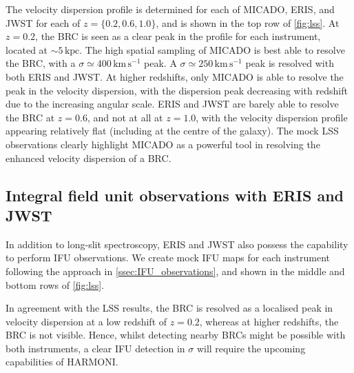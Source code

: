 \documentclass[twocolumn]{aastex631}
\newcommand{\kmps}{\ensuremath{\mathrm{km}\,\mathrm{s}^{-1}} }%
\begin{document}
The velocity dispersion profile is determined for each of MICADO, ERIS, and JWST for each of $z=\{0.2, 0.6, 1.0\}$, and is shown in the top row of \autoref{fig:lss}.
At $z=0.2$, the BRC is seen as a clear peak in the profile for each instrument, located at $\sim5\,\mathrm{kpc}$.
The high spatial sampling of MICADO is best able to resolve the BRC, with a $\sigma\simeq 400\,\kmps$ peak.
A $\sigma\simeq 250\,\kmps$ peak is resolved with both ERIS and JWST.
At higher redshifts, only MICADO is able to resolve the peak in the velocity dispersion, with the dispersion peak decreasing with redshift due to the increasing angular scale. 
ERIS and JWST are barely able to resolve the BRC at $z=0.6$, and not at all at $z=1.0$, with the velocity dispersion profile appearing relatively flat (including at the centre of the galaxy).
The mock LSS observations clearly highlight MICADO as a powerful tool in resolving the enhanced velocity dispersion of a BRC.

\subsection{Integral field unit observations with ERIS and JWST}
In addition to long-slit spectroscopy, ERIS and JWST also possess the capability to perform IFU observations. 
We create mock IFU maps for each instrument following the approach in \autoref{ssec:IFU_observations}, and shown in the middle and bottom rows of \autoref{fig:lss}.

In agreement with the LSS results, the BRC is resolved as a localised peak in velocity dispersion at a low redshift of $z=0.2$, whereas at higher redshifts, the BRC is not visible.
Hence, whilst detecting nearby BRCs might be possible with both instruments, a clear IFU detection in $\sigma$ will require the upcoming capabilities of HARMONI.
\end{document}
